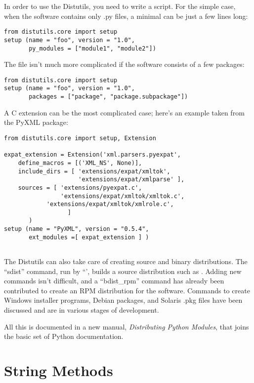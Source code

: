 \documentclass{howto}
\begin{document}
In order to use the Distutils, you need to write a 
script.  For the simple case, when the software contains only .py
files, a minimal  can be just a few lines long:

\begin{verbatim}
from distutils.core import setup
setup (name = "foo", version = "1.0", 
       py_modules = ["module1", "module2"])
\end{verbatim}

The  file isn't much more complicated if the software
consists of a few packages:

\begin{verbatim}
from distutils.core import setup
setup (name = "foo", version = "1.0", 
       packages = ["package", "package.subpackage"])
\end{verbatim}

A C extension can be the most complicated case; here's an example taken from 
the PyXML package:


\begin{verbatim}
from distutils.core import setup, Extension

expat_extension = Extension('xml.parsers.pyexpat',
	define_macros = [('XML_NS', None)],
	include_dirs = [ 'extensions/expat/xmltok',
	                 'extensions/expat/xmlparse' ],
	sources = [ 'extensions/pyexpat.c',
	            'extensions/expat/xmltok/xmltok.c',
 		    'extensions/expat/xmltok/xmlrole.c',
                  ]
       )
setup (name = "PyXML", version = "0.5.4", 
       ext_modules =[ expat_extension ] )
	        
\end{verbatim}

The Distutils can also take care of creating source and binary
distributions.  The ``sdist'' command, run by ``', builds a source distribution such as .
Adding new commands isn't difficult, and a ``bdist_rpm'' command has
already been contributed to create an RPM distribution for the
software.  Commands to create Windows installer programs, Debian
packages, and Solaris .pkg files have been discussed and are in
various stages of development.

All this is documented in a new manual, \textit{Distributing Python
Modules}, that joins the basic set of Python documentation.

\section{String Methods}
\end{document}
